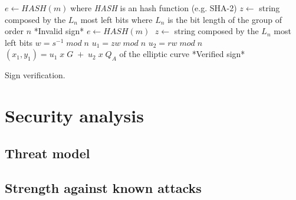 \begin{itemize}
{\begin{algorithm}[h]
\DontPrintSemicolon
{}
\BlankLine
$e\gets HASH(m)\;$where \textit{HASH} is an hash function (e.g. SHA-2)\;
\BlankLine
$z \gets$ string composed by the $L_n$ most left bits\;
where $L_n$ is the bit length of the group of order $n$\;
\BlankLine
{}
{*Invalid sign*}
$e\gets HASH(m)\;$\;
\BlankLine$z \gets$ string composed by the $L_n$ most left bits\;
$w=s^{-1}\; mod\; n$\;
\BlankLine
$u_1 =zw\; mod\; n$\;
$u_2 =rw\; mod\; n$\;
$(x_1, y_1)=u_1\; x\; G\;+\; u_2\; x\; Q_{A}$ of the elliptic curve\;
\BlankLine
{}
{*Verified sign*}
\BlankLine
\caption{Sign verification.}\label{inv:ECDSA_verify}
\end{algorithm}
}
\end{itemize}


\section{Security analysis}

\subsection{Threat model}

\subsection{Strength against known attacks}